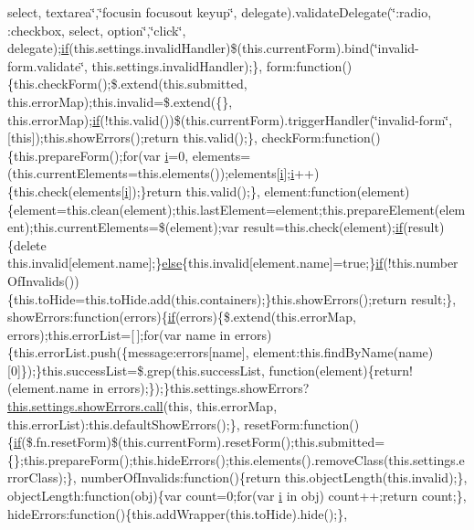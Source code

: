 \begin{DoxyCompactItemize}
select, textarea\char`\"{},\char`\"{}focusin focusout keyup\char`\"{}, delegate).validate\+Delegate(\char`\"{}\+:radio, \+:checkbox, select, option\char`\"{},\char`\"{}click\char`\"{}, delegate);\hyperlink{_scripts_2respond_8min_8js_a93851d60dd037a83509a1757b9ee7b66}{if}(this.\+settings.\+invalid\+Handler)\$(this.\+current\+Form).bind(\char`\"{}invalid-\/form.\+validate\char`\"{}, this.\+settings.\+invalid\+Handler);\}, form\+:function()\{this.\+check\+Form();\$.extend(this.\+submitted, this.\+error\+Map);this.\+invalid=\$.extend(\{\}, this.\+error\+Map);\hyperlink{_scripts_2respond_8min_8js_a93851d60dd037a83509a1757b9ee7b66}{if}(!this.\+valid())\$(this.\+current\+Form).trigger\+Handler(\char`\"{}invalid-\/form\char`\"{}, \mbox{[}this\mbox{]});this.\+show\+Errors();return this.\+valid();\}, check\+Form\+:function()\{this.\+prepare\+Form();for(var \hyperlink{_scripts_2respond_8min_8js_a5e25b1d1bed9ab5f3174b76d6a722180}{i}=0, elements=(this.\+current\+Elements=this.\+elements());elements\mbox{[}\hyperlink{_scripts_2respond_8min_8js_a5e25b1d1bed9ab5f3174b76d6a722180}{i}\mbox{]};\hyperlink{_scripts_2respond_8min_8js_a5e25b1d1bed9ab5f3174b76d6a722180}{i}++)\{this.\+check(elements\mbox{[}\hyperlink{_scripts_2respond_8min_8js_a5e25b1d1bed9ab5f3174b76d6a722180}{i}\mbox{]});\}return this.\+valid();\}, element\+:function(element)\{element=this.\+clean(element);this.\+last\+Element=element;this.\+prepare\+Element(element);this.\+current\+Elements=\$(element);var result=this.\+check(element);\hyperlink{_scripts_2respond_8min_8js_a93851d60dd037a83509a1757b9ee7b66}{if}(result)\{delete this.\+invalid\mbox{[}element.\+name\mbox{]};\}\hyperlink{_scripts_2jquery_8validate_8js_a0544c3fe466e421738dae463968b70ba}{else}\{this.\+invalid\mbox{[}element.\+name\mbox{]}=true;\}\hyperlink{_scripts_2respond_8min_8js_a93851d60dd037a83509a1757b9ee7b66}{if}(!this.\+number\+Of\+Invalids())\{this.\+to\+Hide=this.\+to\+Hide.\+add(this.\+containers);\}this.\+show\+Errors();return result;\}, show\+Errors\+:function(errors)\{\hyperlink{_scripts_2respond_8min_8js_a93851d60dd037a83509a1757b9ee7b66}{if}(errors)\{\$.extend(this.\+error\+Map, errors);this.\+error\+List=\mbox{[}$\,$\mbox{]};for(var name in errors)\{this.\+error\+List.\+push(\{message\+:errors\mbox{[}name\mbox{]}, element\+:this.\+find\+By\+Name(name)\mbox{[}0\mbox{]}\});\}this.\+success\+List=\$.grep(this.\+success\+List, function(element)\{return!(element.\+name in errors);\});\}this.\+settings.\+show\+Errors?\hyperlink{_scripts_2dropzone_8js_aafc46d047b4d7639fd2c4b927ec5048c}{this.\+settings.\+show\+Errors.\+call}(this, this.\+error\+Map, this.\+error\+List)\+:this.\+default\+Show\+Errors();\}, reset\+Form\+:function()\{\hyperlink{_scripts_2respond_8min_8js_a93851d60dd037a83509a1757b9ee7b66}{if}(\$.fn.\+reset\+Form)\$(this.\+current\+Form).reset\+Form();this.\+submitted=\{\};this.\+prepare\+Form();this.\+hide\+Errors();this.\+elements().remove\+Class(this.\+settings.\+error\+Class);\}, number\+Of\+Invalids\+:function()\{return this.\+object\+Length(this.\+invalid);\}, object\+Length\+:function(obj)\{var count=0;for(var \hyperlink{_scripts_2respond_8min_8js_a5e25b1d1bed9ab5f3174b76d6a722180}{i} in obj) count++;return count;\}, hide\+Errors\+:function()\{this.\+add\+Wrapper(this.\+to\+Hide).hide();\}, 
\end{DoxyCompactItemize}
